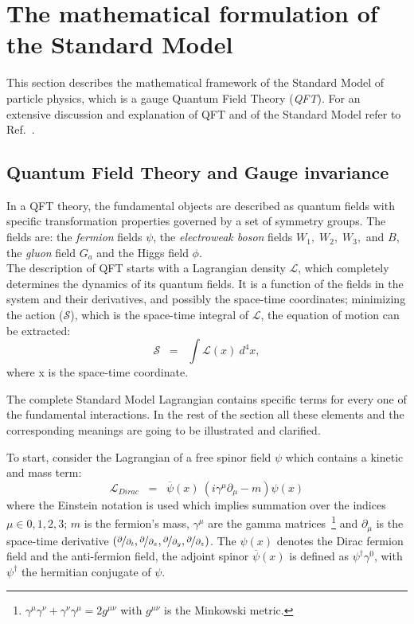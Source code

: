 \section{The mathematical formulation of the Standard Model}\label{sec:mathSM}
This section describes the mathematical framework of the Standard Model of particle physics, which is a gauge Quantum Field Theory (\emph{QFT}). For an extensive discussion and explanation of QFT and of the Standard Model refer to Ref.~\cite{Bardin:1999ak}.
\subsection{Quantum Field Theory and Gauge invariance}\label{sec:qft}
In a QFT theory, the fundamental objects are described as quantum fields with specific transformation properties governed by a set of symmetry groups. The fields are: the \emph{fermion} fields $\psi$, the \emph{electroweak boson} fields $W_1, \; W_2, \; W_3,$ and $B$, the \emph{gluon} field $G_a$ and the Higgs field $\phi$. \\
The description of QFT starts with a Lagrangian density $\mathcal{L}$, which completely determines the dynamics of its quantum fields. It is a function of the fields in the system and their derivatives, and possibly the space-time coordinates; minimizing the action ($\mathcal{S}$), which is the space-time integral of $\mathcal{L}$, the equation of motion can be extracted:
\begin{equation}
\label{eq:action}
 \mathcal{S} \;\; = \;\; \int \mathcal{L}(x) \ d^4x,
\end{equation}
where x is the space-time coordinate.

The complete Standard Model Lagrangian contains specific terms for every one of the fundamental interactions. In the rest of the section all these elements and the corresponding meanings are going to be illustrated and clarified.

To start, consider the Lagrangian of a free spinor field $\psi$ which contains a kinetic and mass term:
\begin{equation}
\label{eq:dirac}
 \mathcal{L}_{Dirac} \;\; = \;\; \overline{\psi}(x)\ (i\gamma^{\mu}\partial_{\mu} - m ) \psi(x)
\end{equation}
where the Einstein notation is used which implies summation over the indices $\mu \in 0,1,2,3$; $m$ is the fermion's mass, $\gamma^{\mu}$ are the gamma matrices~\footnote{$\gamma^{\mu}\gamma^{\nu} + \gamma^{\nu}\gamma^{\mu} = 2g^{\mu\nu}$ with $g^{\mu\nu}$ is the Minkowski metric.} and $\partial_{\mu}$ is the space-time derivative $(\nicefrac{\partial}{\partial_{t}}, \nicefrac{\partial}{\partial_{x}}, \nicefrac{\partial}{\partial_{y}}, \nicefrac{\partial}{\partial_{z}})$. The $\psi(x)$ denotes the Dirac fermion field and the anti-fermion field, the adjoint spinor $\overline{\psi}(x)$ is defined as $\psi^\dag\gamma^{0}$, with $\psi^\dag$ the hermitian conjugate of $\psi$.

